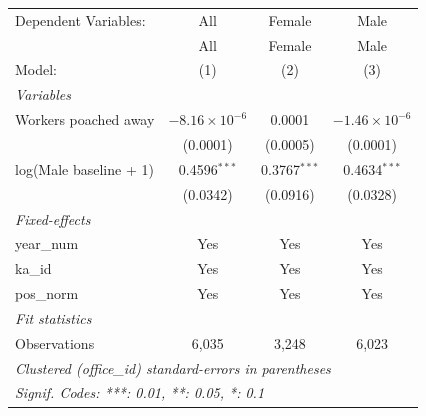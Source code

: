 \begingroup
\centering
\begin{tabular}{lccc}
   \tabularnewline \midrule \midrule
   Dependent Variables:   & All                    & Female         & Male\\  
                          & All                    & Female         & Male \\   
   Model:                 & (1)                    & (2)            & (3)\\  
   \midrule
   \emph{Variables}\\
   Workers poached away   & $-8.16\times 10^{-6}$  & 0.0001         & $-1.46\times 10^{-6}$\\    
                          & (0.0001)               & (0.0005)       & (0.0001)\\   
   log(Male baseline + 1) & 0.4596$^{***}$         & 0.3767$^{***}$ & 0.4634$^{***}$\\   
                          & (0.0342)               & (0.0916)       & (0.0328)\\   
   \midrule
   \emph{Fixed-effects}\\
   year\_num              & Yes                    & Yes            & Yes\\  
   ka\_id                 & Yes                    & Yes            & Yes\\  
   pos\_norm              & Yes                    & Yes            & Yes\\  
   \midrule
   \emph{Fit statistics}\\
   Observations           & 6,035                  & 3,248          & 6,023\\  
   \midrule \midrule
   \multicolumn{4}{l}{\emph{Clustered (office\_id) standard-errors in parentheses}}\\
   \multicolumn{4}{l}{\emph{Signif. Codes: ***: 0.01, **: 0.05, *: 0.1}}\\
\end{tabular}
\par\endgroup

